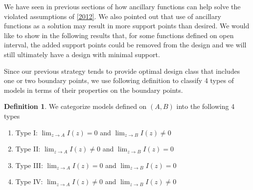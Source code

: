 \documentclass[11pt]{amsart}
\newtheorem{lemma}[theorem]{Lemma}
\theoremstyle{definition}
\newtheorem{definition}{Definition}[section]
\theoremstyle{remark}
\begin{document}
 We have seen in previous sections of how ancillary functions can help solve the violated assumptions of \ref{2012}. We also pointed out that use of ancillary functions as a solution may result in more support points than desired. We would like to show in the following results that, for some functions defined on open interval, the added support points could be removed from the design and we will still ultimately have a design with minimal support. 
 
Since our previous strategy tends to provide optimal design class that includes one or two boundary points, we use following definition to classify 4 types of models in terms of their properties on the boundary points. 
\begin{definition} We categorize models defined on $(A,B)$ into the following 4 types\begin{enumerate}
    \item Type I: $\lim_{z\to A}I(z)=0$ and $\lim_{z\to B}I(z)\ne 0$
    \item Type II: $\lim_{z\to A}I(z)\ne 0$ and $\lim_{z\to B}I(z)=0$
    \item Type III: $\lim_{z\to A}I(z)= 0$ and $\lim_{z\to B}I(z)=0$
    \item Type IV: $\lim_{z\to A}I(z)\ne 0$ and $\lim_{z\to B}I(z)\ne0$
\end{enumerate}
\end{definition}



\end{document}
